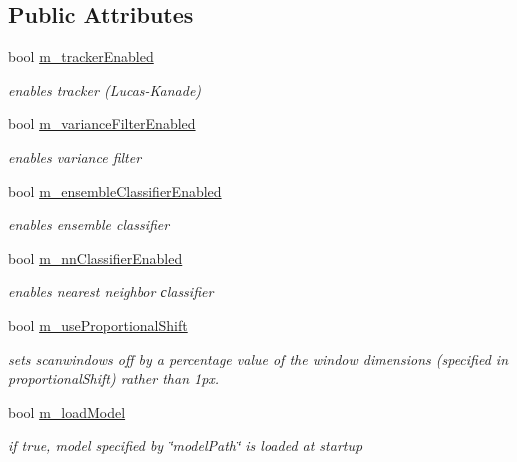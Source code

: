 \subsection*{Public Attributes}
\begin{DoxyCompactItemize}
\item 
bool \hyperlink{classtld_1_1Settings_a54a14f7a08a919ee6ff19514205c6b47}{m\-\_\-tracker\-Enabled}
\begin{DoxyCompactList}\small\item\em enables tracker (Lucas-\/\-Kanade) \end{DoxyCompactList}\item 
bool \hyperlink{classtld_1_1Settings_ab3100039fb52ee1a41813812320a6ca3}{m\-\_\-variance\-Filter\-Enabled}
\begin{DoxyCompactList}\small\item\em enables variance filter \end{DoxyCompactList}\item 
bool \hyperlink{classtld_1_1Settings_af184f95560d875d91951dbbc368ba04d}{m\-\_\-ensemble\-Classifier\-Enabled}
\begin{DoxyCompactList}\small\item\em enables ensemble classifier \end{DoxyCompactList}\item 
bool \hyperlink{classtld_1_1Settings_a8ec793b6668a626308d8ee8d697d9f67}{m\-\_\-nn\-Classifier\-Enabled}
\begin{DoxyCompactList}\small\item\em enables nearest neighbor сlassifier \end{DoxyCompactList}\item 
bool \hyperlink{classtld_1_1Settings_afd89a9d1a0a8dec5ce524eeed5b0f5e0}{m\-\_\-use\-Proportional\-Shift}
\begin{DoxyCompactList}\small\item\em sets scanwindows off by a percentage value of the window dimensions (specified in proportional\-Shift) rather than 1px. \end{DoxyCompactList}\item 
bool \hyperlink{classtld_1_1Settings_a6c06df5b2a9028a1c9a77269601f4a36}{m\-\_\-load\-Model}
\begin{DoxyCompactList}\small\item\em if true, model specified by \char`\"{}model\-Path\char`\"{} is loaded at startup \end{DoxyCompactList}\item 

\end{DoxyCompactItemize}
